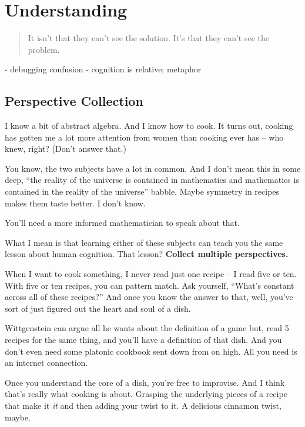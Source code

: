 \chapter{Understanding}

\begin{quote}
It isn't that they can't see the solution. It's that they can't see the problem.
\end{quote}

- debugging confusion
- cognition is relative; metaphor

\section{Perspective Collection}

I know a bit of abstract algebra. And I know how to cook. It turns out, cooking
has gotten me a lot more attention from women than cooking ever has -- who knew,
right? (Don't answer that.)

You know, the two subjects have a lot in common. And I don't mean this in some
deep, ``the reality of the universe is contained in mathematics and mathematics
is contained in the reality of the universe'' babble. Maybe symmetry in recipes
makes them taste better. I don't know.

You'll need a more informed mathematician to speak about that.

What I mean is that learning either of these subjects can teach you the same
lesson about human cognition. That lesson? \textbf{Collect multiple
  perspectives.}

When I want to cook something, I never read just one recipe -- I read five or
ten. With five or ten recipes, you can pattern match. Ask yourself, ``What's
constant across all of these recipes?'' And once you know the answer to that,
well, you've sort of just figured out the heart and soul of a dish.

Wittgenstein can argue all he wants about the definition of a game but, read 5
recipes for the same thing, and you'll have a definition of that dish. And you
don't even need some platonic cookbook sent down from on high. All you need is
an internet connection.

Once you understand the core of a dish, you're free to improvise. And I think
that's really what cooking is about. Grasping the underlying pieces of a recipe
that make it \textit{it} and then adding your twist to it. A delicious cinnamon
twist, maybe.

